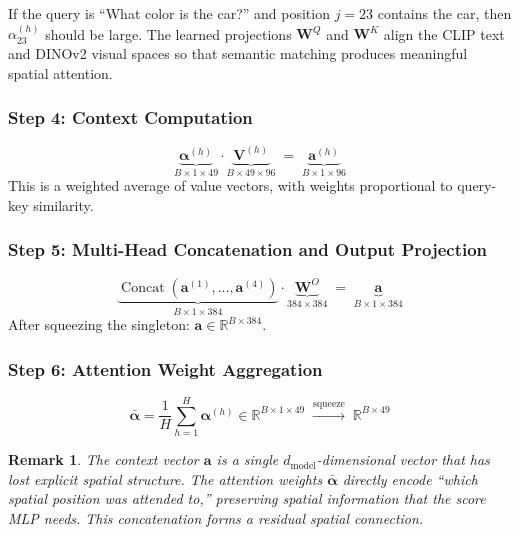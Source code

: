 \documentclass[11pt,a4paper]{article}
\DeclareMathOperator{\Concat}{Concat}
\newcommand{\R}{\mathbb{R}}
\newtheorem{remark}{Remark}
\begin{document}
\begin{notebox}[title={Intuition}]
If the query is ``What color is the car?'' and position $j{=}23$ contains
the car, then $\alpha^{(h)}_{23}$ should be large. The learned projections
$\mathbf{W}^Q$ and $\mathbf{W}^K$ align the CLIP text and DINOv2 visual
spaces so that semantic matching produces meaningful spatial attention.
\end{notebox}

\subsubsection{Step 4: Context Computation}

\begin{equation}
  \underbrace{\boldsymbol{\alpha}^{(h)}}_{B \times 1 \times 49}
  \cdot
  \underbrace{\mathbf{V}^{(h)}}_{B \times 49 \times 96}
  \;=\;
  \underbrace{\mathbf{a}^{(h)}}_{B \times 1 \times 96}
  \label{eq:context}
\end{equation}
This is a weighted average of value vectors, with weights proportional to
query-key similarity.

\subsubsection{Step 5: Multi-Head Concatenation and Output Projection}

\begin{equation}
  \underbrace{\Concat(\mathbf{a}^{(1)}, \ldots, \mathbf{a}^{(4)})}%
    _{B \times 1 \times 384}
  \cdot
  \underbrace{\mathbf{W}^O}_{384 \times 384}
  \;=\;
  \underbrace{\mathbf{a}}_{B \times 1 \times 384}
  \label{eq:multihead}
\end{equation}
After squeezing the singleton: $\mathbf{a} \in \R^{B \times 384}$.

\subsubsection{Step 6: Attention Weight Aggregation}

\begin{equation}
  \bar{\boldsymbol{\alpha}} =
    \frac{1}{H}\sum_{h=1}^{H} \boldsymbol{\alpha}^{(h)}
    \in \R^{B \times 1 \times 49}
    \;\xrightarrow{\text{squeeze}}\;
    \R^{B \times 49}
  \label{eq:alpha_avg}
\end{equation}

\begin{remark}
  The context vector $\mathbf{a}$ is a single $d_{\text{model}}$-dimensional
  vector that has lost explicit spatial structure. The attention weights
  $\bar{\boldsymbol{\alpha}}$ directly encode ``which spatial position was
  attended to,'' preserving spatial information that the score MLP needs.
  This concatenation forms a \emph{residual spatial connection}.
\end{remark}
\end{document}
